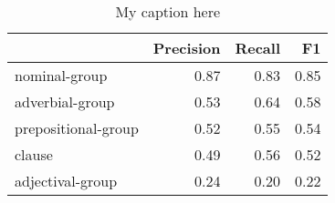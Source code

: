 \begin{table}[!ht]
\centering
\begin{tabular}{lrrr}
\toprule
{} &  Precision &  Recall &   F1 \\
\midrule
nominal-group       &       0.87 &    0.83 & 0.85 \\
adverbial-group     &       0.53 &    0.64 & 0.58 \\
prepositional-group &       0.52 &    0.55 & 0.54 \\
clause              &       0.49 &    0.56 & 0.52 \\
adjectival-group    &       0.24 &    0.20 & 0.22 \\
\bottomrule
\end{tabular}
\caption{My caption here}
\label{tab:unit-types-exact-F1}
\end{table}